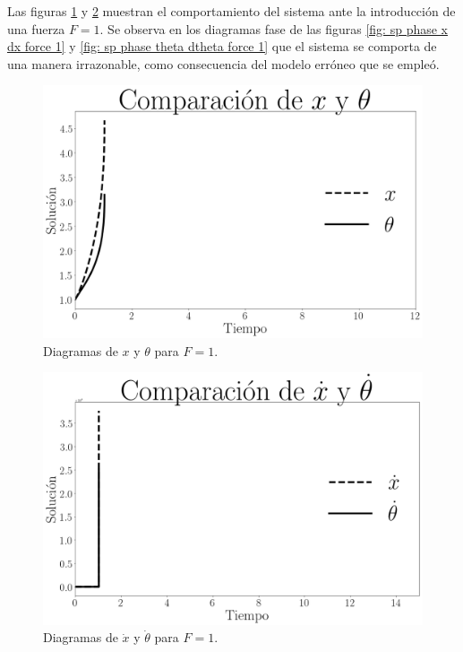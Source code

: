 \documentclass[12pt,letterpaper]{article}
\begin{document}
Las figuras \ref{fig: sp x theta force 1} y \ref{fig: sp dx dtheta force 1} muestran el comportamiento del sistema ante la introducción de una fuerza $F=1$. 
Se observa en los diagramas fase de las figuras \ref{fig: sp phase x dx force 1} y \ref{fig: sp phase theta dtheta force 1} que el sistema se comporta de una manera irrazonable, como consecuencia del modelo erróneo que se empleó.

\begin{figure}[h]
 \centering
 \includegraphics[scale=0.4]{img/sp_x_theta_f1.png}
 \caption{Diagramas de $x$ y $\theta$ para $F=1$.}
 \label{fig: sp x theta force 1}
\end{figure}

\begin{figure}[h]
 \centering
 \includegraphics[scale=0.4]{img/sp_dx_dtheta_f1.png}
 \caption{Diagramas de $\dot{x}$ y $\dot{\theta}$ para $F=1$.}
 \label{fig: sp dx dtheta force 1}
\end{figure}
\end{document}
